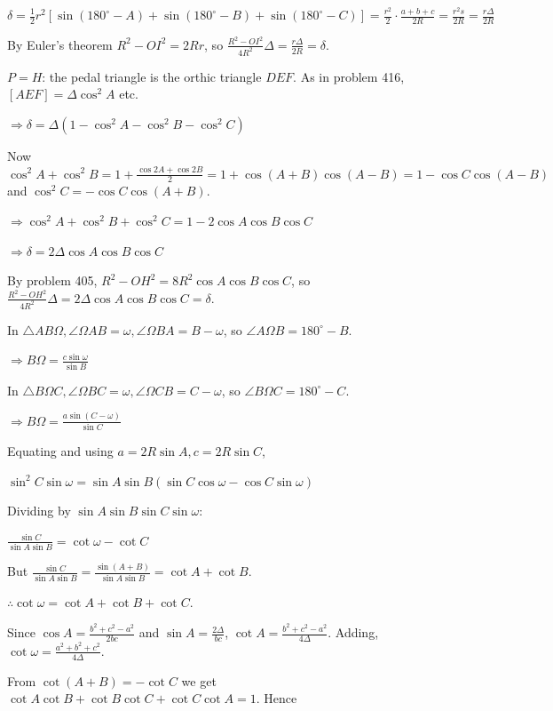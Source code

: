   $\delta = \frac{1}{2}r^2[\sin(180^\circ - A) + \sin(180^\circ - B) + \sin(180^\circ - C)] =
  \frac{r^2}{2}\cdot\frac{a + b + c}{2R} = \frac{r^2s}{2R} = \frac{r\Delta}{2R}$

  By Euler's theorem $R^2 - OI^2 = 2Rr$, so $\frac{R^2 - OI^2}{4R^2}\Delta = \frac{r\Delta}{2R} = \delta$.

  $P = H$: the pedal triangle is the orthic triangle $DEF$. As in problem 416, $[AEF] = \Delta\cos^2A$ etc.

  $\Rightarrow \delta = \Delta(1 - \cos^2A - \cos^2B - \cos^2C)$

  Now $\cos^2A + \cos^2B = 1 + \frac{\cos2A + \cos2B}{2} = 1 + \cos(A + B)\cos(A - B) = 1 - \cos C\cos(A -
  B)$ and $\cos^2C = -\cos C\cos(A + B)$.

  $\Rightarrow \cos^2A + \cos^2B + \cos^2C = 1 - 2\cos A\cos B\cos C$

  $\Rightarrow \delta = 2\Delta\cos A\cos B\cos C$

  By problem 405, $R^2 - OH^2 = 8R^2\cos A\cos B\cos C$, so $\frac{R^2 - OH^2}{4R^2}\Delta = 2\Delta\cos A\cos
  B\cos C = \delta$.
\item In $\triangle AB\Omega, \angle\Omega AB = \omega, \angle\Omega BA = B - \omega$, so $\angle A\Omega B =
  180^\circ - B$.

  $\Rightarrow B\Omega = \frac{c\sin\omega}{\sin B}$

  In $\triangle B\Omega C, \angle\Omega BC = \omega, \angle\Omega CB = C - \omega$, so $\angle B\Omega C =
  180^\circ - C$.

  $\Rightarrow B\Omega = \frac{a\sin(C - \omega)}{\sin C}$

  Equating and using $a = 2R\sin A, c = 2R\sin C$,

  $\sin^2C\sin\omega = \sin A\sin B(\sin C\cos\omega - \cos C\sin\omega)$

  Dividing by $\sin A\sin B\sin C\sin\omega$:

  $\frac{\sin C}{\sin A\sin B} = \cot\omega - \cot C$

  But $\frac{\sin C}{\sin A\sin B} = \frac{\sin(A + B)}{\sin A\sin B} = \cot A + \cot B$.

  $\therefore \cot\omega = \cot A + \cot B + \cot C$.

  Since $\cos A = \frac{b^2 + c^2 - a^2}{2bc}$ and $\sin A = \frac{2\Delta}{bc}$, $\cot A = \frac{b^2 + c^2 -
  a^2}{4\Delta}$. Adding, $\cot\omega = \frac{a^2 + b^2 + c^2}{4\Delta}$.

  From $\cot(A + B) = -\cot C$ we get $\cot A\cot B + \cot B\cot C + \cot C\cot A = 1$. Hence

